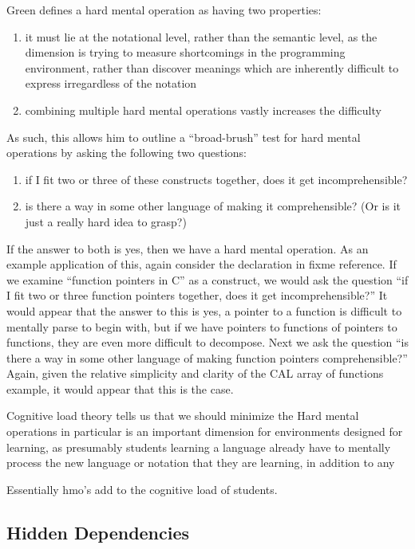 Green defines a hard mental operation as having two properties:

\begin{enumerate}
	\item it must lie at the notational level, rather than the semantic level, as the dimension is trying to measure shortcomings in the programming environment, rather than discover meanings which are inherently difficult to express irregardless of the notation
	\item combining multiple hard mental operations vastly increases the difficulty
\end{enumerate}

As such, this allows him to outline a ``broad-brush'' test for hard mental operations by asking the following two questions: 

\begin{enumerate}
	\item if I fit two or three of these constructs together, does it get incomprehensible?
	\item is there a way in some other language of making it comprehensible? (Or is it just a really hard idea to grasp?)
\end{enumerate}

If the answer to both is yes, then we have a hard mental operation.  As an example application of this, again consider the declaration in fixme reference.  If we examine ``function pointers in C'' as a construct, we would ask the question ``if I fit two or three function pointers together, does it get incomprehensible?''  It would appear that the answer to this is yes, a pointer to a function is difficult to mentally parse to begin with, but if we have pointers to functions of pointers to functions, they are even more difficult to decompose.  Next we ask the question ``is there a way in some other language of making function pointers comprehensible?''  Again, given the relative simplicity and clarity of the CAL array of functions example, it would appear that this is the case.  

Cognitive load theory tells us that we should minimize the 
Hard mental operations in particular is an important dimension for environments designed for learning, as presumably students learning a language already have to mentally process the new language or notation that they are learning, in addition to any 

Essentially hmo's add to the cognitive load of students.

\subsection{Hidden Dependencies}
\label{hiddendependenciesoutline}

